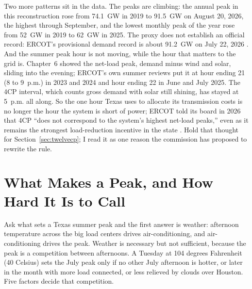 Two more patterns sit in the data. The peaks are climbing: the annual peak in this reconstruction rose from 74.1~GW in 2019 to 91.5~GW on August 20, 2026, the highest through September, and the lowest monthly peak of the year rose from 52~GW in 2019 to 62~GW in 2025. The proxy does not establish an official record: ERCOT's provisional demand record is about 91.2~GW on July 22, 2026 \autocite{ercot2026factsheet}. %
And the summer peak hour is not moving, while the hour that matters to the grid is. Chapter~6 showed the net-load peak, demand minus wind and solar, sliding into the evening; ERCOT's own summer reviews put it at hour ending 21 (8 to 9~p.m.) in 2023 and 2024 and hour ending 22 in June and July 2025. %
The 4CP interval, which counts gross demand with solar still shining, has stayed at 5~p.m. all along. So the one hour Texas uses to allocate its transmission costs is no longer the hour the system is short of power; ERCOT told its board in 2026 that 4CP ``does not correspond to the system's highest net-load peaks,'' even as it remains the strongest load-reduction incentive in the state \autocite{ercotsummer2025review,ercotboard2026dr}. %
Hold that thought for Section~\ref{sec:twelvecp}; I read it as one reason the commission has proposed to rewrite the rule.

\section{What Makes a Peak, and How Hard It Is to Call}
\label{sec:fourcp-factors}

Ask what sets a Texas summer peak and the first answer is weather: afternoon temperature across the big load centers drives air-conditioning, and air-conditioning drives the peak. Weather is necessary but not sufficient, because the peak is a competition between afternoons. A Tuesday at 104 degrees Fahrenheit (40 Celsius) sets the July peak only if no other July afternoon is hotter, or later in the month with more load connected, or less relieved by clouds over Houston. Five factors decide that competition.

